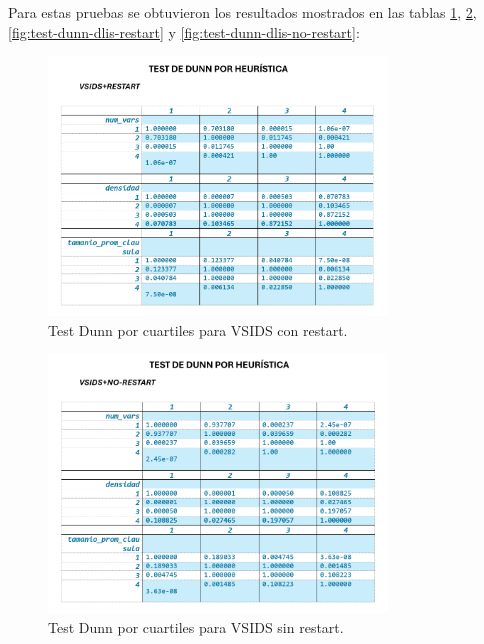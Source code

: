 Para estas pruebas se obtuvieron los resultados mostrados en las tablas \ref{fig:test-dunn-vsids-restart}, \ref{fig:test-dunn-vsids-no-restart}, \ref{fig:test-dunn-dlis-restart} y \ref{fig:test-dunn-dlis-no-restart}:

\begin{figure}[ht]
    \centering
    \includegraphics[width=0.8\textwidth]{Graphics/test_dunn_vsids_restart.png}
    \caption{Test Dunn por cuartiles para VSIDS con restart.}
    \label{fig:test-dunn-vsids-restart}
\end{figure}

\begin{figure}[ht]
    \centering
    \includegraphics[width=0.8\textwidth]{Graphics/test_dunn_vsids_no_restart.png}
    \caption{Test Dunn por cuartiles para VSIDS sin restart.}
    \label{fig:test-dunn-vsids-no-restart}
\end{figure}

